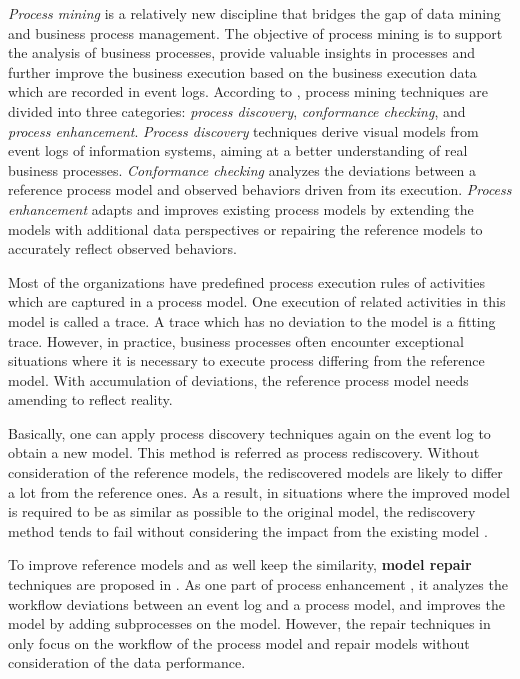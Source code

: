 %
\emph{Process mining} is a relatively new discipline that bridges the gap of data mining and business process management. The objective of process mining is to support the analysis of business processes, provide valuable insights in processes and further improve the business execution based on the business execution data which are recorded in event logs. According to  \cite{van2011process}, process mining techniques are divided into three categories: \emph{process discovery}, \emph{conformance checking}, and \emph{process enhancement}. \emph{Process discovery} techniques derive visual models from event logs of information systems, aiming at a better understanding of real business processes. \emph{Conformance checking} analyzes the deviations between a reference process model and observed behaviors driven from its execution. \emph{Process enhancement} adapts and improves existing process models by extending the models with additional data perspectives or repairing the reference models to accurately reflect observed behaviors. 

Most of the organizations have predefined process execution rules of activities which are captured in a process model. One execution of related activities in this model is called a trace. A trace which has no deviation to the model is a fitting trace. However, in practice, business processes often encounter exceptional situations where it is necessary to execute process differing from the reference model. With accumulation of deviations, the reference process model needs amending to reflect reality. 


Basically, one can apply process discovery techniques again on the event log to obtain a new model. This method is referred as process rediscovery.  Without consideration of the reference models, the rediscovered models are likely to differ a lot from the reference ones. As a result, in situations where  the improved model is required to be as similar as possible to the original model, the rediscovery method tends to fail without considering the impact from the existing model \cite{fahland2012repairing}. 

To improve reference models and as well keep the similarity, \textbf{model repair} techniques are proposed in  \cite{fahland2012repairing}.
As one part of process enhancement \cite{fahland2012repairing}, it analyzes the workflow deviations between an event log and a process model, and improves the model by adding subprocesses on the model. However, the repair techniques in \cite{fahland2012repairing, fahland2015model}  only focus on the workflow of the process model and repair models without consideration of the data performance.


